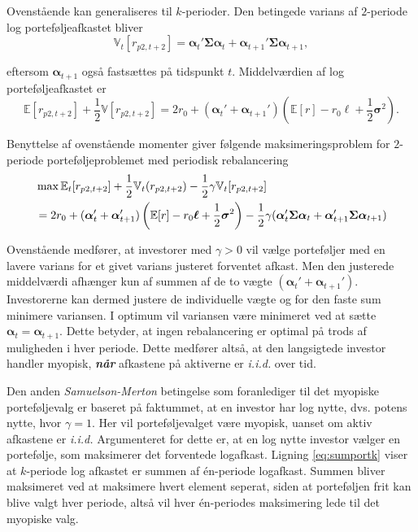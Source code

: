 \documentclass[
  a4paper,
  oneside]{memoir}
\begin{document}
Ovenstående kan generaliseres til \(k\)-perioder. Den betingede varians af \(2\)-periode log porteføljeafkastet bliver
\[\mathbb{V}_t[r_{p2,t+2}]=\bm{\alpha}_t'\bm{\Sigma}\bm{\alpha}_t+\bm{\alpha}_{t+1}'\bm{\Sigma}\bm{\alpha}_{t+1},\]

eftersom \(\bm{\alpha}_{t+1}\) også fastsættes på tidspunkt \(t\). Middelværdien af log porteføljeafkastet er
\[\mathbb{E}[r_{p2,t+2}]+\frac{1}{2}\mathbb{V}[r_{p2,t+2}]=2r_0 + (\bm{\alpha}_t'+\bm{\alpha}_{t+1}')(\mathbb{E}[r]-r_0\bm{\ell}+\frac{1}{2}\bm{\sigma}^2).\]

Benyttelse af ovenstående momenter giver følgende maksimeringsproblem for \(2\)-periode porteføljeproblemet med periodisk rebalancering
\begin{align}
&\max\mathbb{E}_t[r_{p2,t+2}] + \frac{1}{2} \mathbb{V}_t(r_{p2,t+2})-\frac{1}{2}\gamma \mathbb{V}_t[r_{p2,t+2}]\notag \\
&=2r_0+(\bm{\alpha}_t'+\bm{\alpha}_{t+1}')\left(\mathbb{E}[r]-r_0\bm{\ell}+\frac{1}{2}\bm{\sigma}^2\right)-\frac{1}{2}\gamma (\bm{\alpha}_t'\bm{\Sigma}\bm{\alpha}_t+\bm{\alpha}_{t+1}'\bm{\Sigma}\bm{\alpha}_{t+1})
\label{eq:CRRAmakslogk2periode}
\end{align}

Ovenstående medfører, at investorer med \(\gamma>0\) vil vælge porteføljer med en lavere varians for et givet varians justeret forventet afkast. Men den justerede middelværdi afhænger kun af summen af de to vægte \((\bm{\alpha}_t'+\bm{\alpha}_{t+1}')\). Investorerne kan dermed justere de individuelle vægte og for den faste sum minimere variansen. I optimum vil variansen være minimeret ved at sætte \(\bm{\alpha}_t=\bm{\alpha}_{t+1}\). Dette betyder, at ingen rebalancering er optimal på trods af muligheden i hver periode. Dette medfører altså, at den langsigtede investor handler myopisk, \textbf{\emph{når}} afkastene på aktiverne er \emph{i.i.d.} over tid.

Den anden \emph{Samuelson-Merton} betingelse som foranlediger til det myopiske porteføljevalg er baseret på faktummet, at en investor har log nytte, dvs. potens nytte, hvor \(\gamma=1\). Her vil porteføljevalget være myopisk, uanset om aktiv afkastene er \emph{i.i.d.} Argumenteret for dette er, at en log nytte investor vælger en portefølje, som maksimerer det forventede logafkast. Ligning \eqref{eq:sumportk} viser at \(k\)-periode log afkastet er summen af én-periode logafkast. Summen bliver maksimeret ved at maksimere hvert element seperat, siden at porteføljen frit kan blive valgt hver periode, altså vil hver én-periodes maksimering lede til det myopiske valg.
\end{document}
